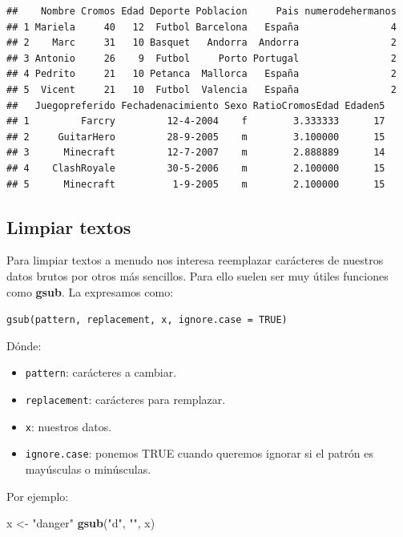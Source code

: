 \documentclass[]{book}
\newenvironment{Shaded}{\begin{snugshade}}{\end{snugshade}}
\newcommand{\KeywordTok}[1]{\textcolor[rgb]{0.13,0.29,0.53}{\textbf{#1}}}
\newcommand{\NormalTok}[1]{#1}
\newcommand{\StringTok}[1]{\textcolor[rgb]{0.31,0.60,0.02}{#1}}
\theoremstyle{definition}
\theoremstyle{definition}
\theoremstyle{definition}
\theoremstyle{remark}
\begin{document}
\begin{verbatim}
##    Nombre Cromos Edad Deporte Poblacion     Pais numerodehermanos
## 1 Mariela     40   12  Futbol Barcelona   España                4
## 2    Marc     31   10 Basquet   Andorra  Andorra                2
## 3 Antonio     26    9  Futbol     Porto Portugal                2
## 4 Pedrito     21   10 Petanca  Mallorca   España                2
## 5  Vicent     21   10  Futbol  Valencia   España                2
##   Juegopreferido Fechadenacimiento Sexo RatioCromosEdad Edaden5
## 1         Farcry         12-4-2004    f        3.333333      17
## 2     GuitarHero         28-9-2005    m        3.100000      15
## 3      Minecraft         12-7-2007    m        2.888889      14
## 4    ClashRoyale         30-5-2006    m        2.100000      15
## 5      Minecraft          1-9-2005    m        2.100000      15
\end{verbatim}

\hypertarget{limpiar-textos}{%
\subsection{Limpiar textos}\label{limpiar-textos}}

Para limpiar textos a menudo nos interesa reemplazar carácteres de
nuestros datos brutos por otros más sencillos. Para ello suelen ser muy
útiles funciones como \textbf{gsub}. La expresamos como:

\texttt{gsub(pattern,\ replacement,\ x,\ ignore.case\ =\ TRUE)}

Dónde:

\begin{itemize}
\item
  \texttt{pattern}: carácteres a cambiar.
\item
  \texttt{replacement}: carácteres para remplazar.
\item
  \texttt{x}: nuestros datos.
\item
  \texttt{ignore.case}: ponemos TRUE cuando queremos ignorar si el
  patrón es mayúsculas o minúsculas.
\end{itemize}

Por ejemplo:

\begin{Shaded}
\begin{Highlighting}[]
\NormalTok{x <-}\StringTok{ "danger"}
\KeywordTok{gsub}\NormalTok{(}\StringTok{"d"}\NormalTok{, }\StringTok{""}\NormalTok{, x)}
\end{Highlighting}
\end{Shaded}
\end{document}
